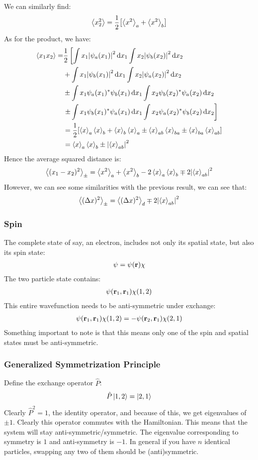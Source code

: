 We can similarly find:
\begin{align*}
  \ev{x_2^2}=\dfrac{1}{2}\qty[\ev{x^2}_a+\ev{x^2}_b]
\end{align*}
As for the product, we have:
\begin{align*}
  \ev{x_1x_2}=&\dfrac{1}{2}
  \left[\int x_1\abs{\psi_a(x_1)}^2\dd{x_1}\int x_2\abs{\psi_b(x_2)}^2\dd{x_2}\right.\\
    &+\int x_1\abs{\psi_b(x_1)}^2\dd{x_1}\int x_2\abs{\psi_a(x_2)}^2\dd{x_2}\\
    &\pm\int x_1\psi_a(x_1)^*\psi_b(x_1)\dd{x_1}\int x_2\psi_b(x_2)^*\psi_a(x_2)\dd{x_2}\\
    &\left.\pm\int x_1\psi_b(x_1)^*\psi_a(x_1)\dd{x_1}
    \int x_2\psi_a(x_2)^*\psi_b(x_2)\dd{x_2}\right]\\
  &=\dfrac{1}{2}\qty[\ev{x}_a\ev{x}_b+\ev{x}_b\ev{x}_a
    \pm\ev{x}_{ab}\ev{x}_{ba}\pm\ev{x}_{ba}\ev{x}_{ab}]\\
  &=\ev{x}_a\ev{x}_b\pm\abs{\ev{x}_{ab}}^2
\end{align*}
Hence the average squared distance is:
\begin{align*}
  \ev{(x_1-x_2)^2}_\pm=\ev{x^2}_a+\ev{x^2}_b-2\ev{x}_a\ev{x}_b\mp2\abs{\ev{x}_{ab}}^2
\end{align*}
However, we can see some similarities with the previous result, we can see that:
\begin{align*}
  \ev{(\Delta x)^2}_\pm=\ev{(\Delta x)^2}_d\mp2\abs{\ev{x}_{ab}}^2
\end{align*}
\subsubsection{Spin}
The complete state of say, an electron, includes not only its spatial state, but also its spin state:
\begin{align*}
  \psi=\psi(\vb{r})\chi
\end{align*}
The two particle state contains:
\begin{align*}
  \psi(\vb{r}_1,\vb{r}_1)\chi(1,2)
\end{align*}
This entire wavefunction needs to be anti-symmetric under exchange:
\begin{align*}
  \psi(\vb{r}_1,\vb{r}_1)\chi(1,2)=-\psi(\vb{r}_2,\vb{r}_1)\chi(2,1)
\end{align*}
Something important to note is that this means only one of the spin and spatial states must be anti-symmetric.
\subsubsection{Generalized Symmetrization Principle}
Define the exchange operator $\hat{P}$:
\begin{align*}
  \hat{P}\ket{1,2}=\ket{2,1}
\end{align*}
Clearly $\hat{P}^2=1$, the identity operator, and because of this, we get eigenvalues of $\pm1$. Clearly this operator commutes with the Hamiltonian. This means that the system will stay anti-symmetric/symmetric. The eigenvalue corresponding to symmetry is $1$ and anti-symmetry is $-1$. In general if you have $n$ identical particles, swapping any two of them should be (anti)symmetric. 
